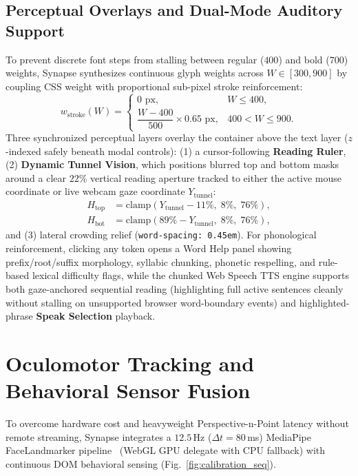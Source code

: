 \documentclass[conference]{IEEEtran}
\begin{document}
\subsection{Perceptual Overlays and Dual-Mode Auditory Support}
To prevent discrete font steps from stalling between regular ($400$) and bold ($700$) weights, Synapse synthesizes continuous glyph weights across $W \in [300, 900]$ by coupling CSS weight with proportional sub-pixel stroke reinforcement:
\begin{equation}
    w_{\text{stroke}}(W) =
    \begin{cases}
        0\text{ px}, & W \le 400, \\
        \dfrac{W - 400}{500} \times 0.65\text{ px}, & 400 < W \le 900.
    \end{cases}
\end{equation}
Three synchronized perceptual layers overlay the container above the text layer ($z$-indexed safely beneath modal controls): (1) a cursor-following \textbf{Reading Ruler}, (2) \textbf{Dynamic Tunnel Vision}, which positions blurred top and bottom masks around a clear $22\%$ vertical reading aperture tracked to either the active mouse coordinate or live webcam gaze coordinate $Y_{\text{tunnel}}$:
\begin{align}
    H_{\text{top}} &= \text{clamp}(Y_{\text{tunnel}} - 11\%,\; 8\%,\; 76\%), \\
    H_{\text{bot}} &= \text{clamp}(89\% - Y_{\text{tunnel}},\; 8\%,\; 76\%),
\end{align}
and (3) lateral crowding relief (\texttt{word-spacing: 0.45em}). For phonological reinforcement, clicking any token opens a Word Help panel showing prefix/root/suffix morphology, syllabic chunking, phonetic respelling, and rule-based lexical difficulty flags, while the chunked Web Speech TTS engine supports both gaze-anchored sequential reading (highlighting full active sentences cleanly without stalling on unsupported browser word-boundary events) and highlighted-phrase \textbf{Speak Selection} playback.

\section{Oculomotor Tracking and Behavioral Sensor Fusion}

To overcome hardware cost and heavyweight Perspective-n-Point latency without remote streaming, Synapse integrates a $12.5$\,Hz ($\Delta t = 80$\,ms) MediaPipe FaceLandmarker pipeline~\cite{16} (WebGL GPU delegate with CPU fallback) with continuous DOM behavioral sensing (Fig.~\ref{fig:calibration_seq}).
\end{document}
